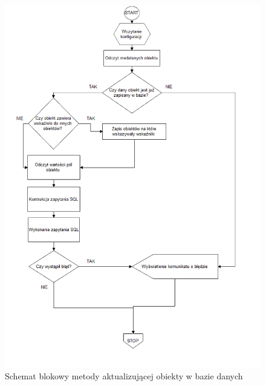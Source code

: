 \documentclass[12pt]{report}
\begin{document}
\begin{figure}[H]
\centering
\includegraphics[width=\textwidth]{resources/update_schema.png}
\caption{Schemat blokowy metody aktualizującej obiekty w bazie danych}
\end{figure}
\end{document}
